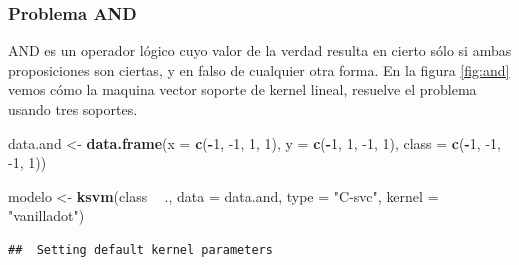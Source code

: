 \documentclass[12pt,spanish,a4paper]{article}
\newenvironment{Shaded}{\begin{snugshade}}{\end{snugshade}}
\newcommand{\CommentTok}[1]{\textcolor[rgb]{0.56,0.35,0.01}{\textit{#1}}}
\newcommand{\DataTypeTok}[1]{\textcolor[rgb]{0.13,0.29,0.53}{#1}}
\newcommand{\DecValTok}[1]{\textcolor[rgb]{0.00,0.00,0.81}{#1}}
\newcommand{\FloatTok}[1]{\textcolor[rgb]{0.00,0.00,0.81}{#1}}
\newcommand{\KeywordTok}[1]{\textcolor[rgb]{0.13,0.29,0.53}{\textbf{#1}}}
\newcommand{\NormalTok}[1]{#1}
\newcommand{\OperatorTok}[1]{\textcolor[rgb]{0.81,0.36,0.00}{\textbf{#1}}}
\newcommand{\StringTok}[1]{\textcolor[rgb]{0.31,0.60,0.02}{#1}}
\numberwithin{equation}{section}
\begin{document}
\hypertarget{problema-and}{%
\subsubsection{Problema AND}\label{problema-and}}

AND es un operador lógico cuyo valor de la verdad resulta en cierto sólo
si ambas proposiciones son ciertas, y en falso de cualquier otra forma.
En la figura \ref{fig:and} vemos cómo la maquina vector soporte de
kernel lineal, resuelve el problema usando tres soportes.

\begin{Shaded}
\begin{Highlighting}[]
\NormalTok{data.and <-}\StringTok{ }\KeywordTok{data.frame}\NormalTok{(}\DataTypeTok{x =} \KeywordTok{c}\NormalTok{(}\OperatorTok{-}\DecValTok{1}\NormalTok{, }\DecValTok{-1}\NormalTok{, }\DecValTok{1}\NormalTok{, }\DecValTok{1}\NormalTok{), }
                   \DataTypeTok{y =} \KeywordTok{c}\NormalTok{(}\OperatorTok{-}\DecValTok{1}\NormalTok{, }\DecValTok{1}\NormalTok{, }\DecValTok{-1}\NormalTok{, }\DecValTok{1}\NormalTok{),}
                   \DataTypeTok{class =} \KeywordTok{c}\NormalTok{(}\OperatorTok{-}\DecValTok{1}\NormalTok{, }\DecValTok{-1}\NormalTok{, }\DecValTok{-1}\NormalTok{, }\DecValTok{1}\NormalTok{))}

\NormalTok{modelo <-}\StringTok{ }\KeywordTok{ksvm}\NormalTok{(class }\OperatorTok{~}\StringTok{ }\NormalTok{., }
               \DataTypeTok{data =}\NormalTok{ data.and, }
               \DataTypeTok{type =} \StringTok{"C-svc"}\NormalTok{, }
               \DataTypeTok{kernel =} \StringTok{"vanilladot"}\NormalTok{)}
\end{Highlighting}
\end{Shaded}

\begin{verbatim}
##  Setting default kernel parameters
\end{verbatim}

\begin{Shaded}
\end{Shaded}
\end{document}
